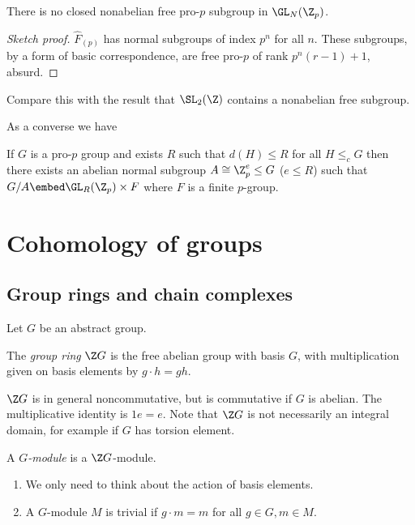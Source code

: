 \documentclass[a4paper]{article}
\begin{document}
\begin{corollary}
  There is no closed nonabelian free pro-\(p\) subgroup in \(\GL_N(\Z_p)\).
\end{corollary}

\begin{proof}[Sketch proof]
  \(\hat F_{(p)}\) has normal subgroups of index \(p^n\) for all \(n\). These subgroups, by a form of basic correspondence, are free pro-\(p\) of rank \(p^n(r - 1) + 1\), absurd.
\end{proof}

Compare this with the result that \(\SL_2(\Z)\) contains a nonabelian free subgroup.

As a converse we have

\begin{theorem}
  If \(G\) is a pro-\(p\) group and exists \(R\) such that \(d(H) \leq R\) for all \(H \leq_c G\) then there exists an abelian normal subgroup \(A \cong \Z_p^e \leq G\) (\(e \leq R\)) such that \(G/A \embed \GL_R(\Z_p) \times F\) where \(F\) is a finite \(p\)-group.
\end{theorem}

\section{Cohomology of groups}

\subsection{Group rings and chain complexes}

Let \(G\) be an abstract group.

\begin{definition}
  The \emph{group ring} \(\Z G\) is the free abelian group with basis \(G\), with multiplication given on basis elements by \(g \cdot h = gh\).
\end{definition}

\(\Z G\) is in general noncommutative, but is commutative if \(G\) is abelian. The multiplicative identity is \(1 e = e\). Note that \(\Z G\) is not necessarily an integral domain, for example if \(G\) has torsion element.

\begin{definition}[\(G\)-module]
  A \emph{\(G\)-module} is a \(\Z G\)-module.
\end{definition}

\begin{remark}\leavevmode
  \begin{enumerate}
  \item We only need to think about the action of basis elements.
  \item A \(G\)-module \(M\) is trivial if \(g \cdot m = m\) for all \(g \in G, m \in M\).
  \end{enumerate}
\end{remark}
\end{document}
